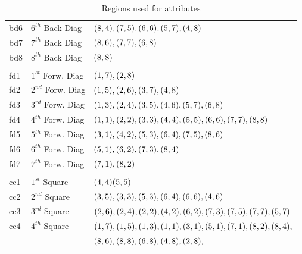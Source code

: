 \begin{table}[h!]
\begin{tabular} {|l|l|l|}
bd6 & $6^{th}$ Back Diag & $ (8,4), (7,5), (6,6), (5,7), (4,8) $\\
bd7 & $7^{th}$ Back Diag & $ (8,6), (7,7), (6,8) $\\
bd8 & $8^{th}$ Back Diag & $ (8,8) $\\
&&\\
fd1 & $1^{st}$ Forw. Diag & $ (1,7), (2,8) $\\
fd2 & $2^{nd}$ Forw. Diag & $ (1,5), (2,6), (3,7), (4,8) $\\
fd3 & $3^{rd}$ Forw. Diag & $ (1,3), (2,4), (3,5), (4,6), (5,7), (6,8) $\\
fd4 & $4^{th}$ Forw. Diag & $ (1,1), (2,2), (3,3), (4,4), (5,5), (6,6), (7,7), (8,8) $\\
fd5 & $5^{th}$ Forw. Diag & $ (3,1), (4,2), (5,3), (6,4), (7,5), (8,6) $\\
fd6 & $6^{th}$ Forw. Diag & $ (5,1), (6,2), (7,3), (8,4) $\\
fd7 & $7^{th}$ Forw. Diag & $ (7,1), (8,2) $\\
&&\\
cc1 & $1^{st}$ Square & $ (4,4) (5,5) $\\
cc2 & $2^{nd}$ Square & $ (3,5), (3,3), (5,3), (6,4), (6,6), (4,6) $\\
cc3 & $3^{rd}$ Square & $ (2,6), (2,4), (2,2), (4,2), (6,2), (7,3), (7,5), (7,7), (5,7) $\\
cc4 & $4^{th}$ Square & $ (1,7), (1,5), (1,3), (1,1), (3,1), (5,1), (7,1), (8,2), (8,4),$ \\ 
& & $ (8,6), (8,8), (6,8), (4,8), (2,8), $\\
\hline
	\end{tabular}	
	\caption{Regions used for attributes}
	\label{tab:attribute_regions}
\end{table}

